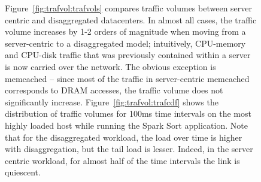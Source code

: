 %
\begin{figure}
    \centering
    \caption{\small{
    Figure~\ref{fig:trafvol:trafvols} compares traffic volumes between server centric and disaggregated datacenters. In almost all cases, the traffic volume increases by 1-2 orders of magnitude when moving from a server-centric to a disaggregated model; intuitively, CPU-memory and CPU-disk traffic that was previously contained within a server is now carried over the network. The obvious exception is memcached -- since most of the traffic in server-centric memcached corresponds to DRAM accesses, the traffic volume does not significantly increase.
    Figure~\ref{fig:trafvol:trafcdf} shows the distribution of traffic volumes for 100ms time intervals on the most highly loaded host while running the Spark Sort application. Note that for the disaggregated workload, the load over time is higher with disaggregation, but the tail load is lesser. Indeed, in the server centric workload, for almost half of the time intervals the link is quiescent.
    }}
    \label{fig:trafvol}
\end{figure}
%

